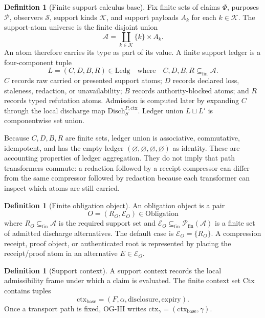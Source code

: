 \documentclass[11pt,twoside]{article}
\theoremstyle{definition}
\newtheorem{definition}[theorem]{Definition}
\newcommand{\Disch}{\mathrm{Disch}}
\newcommand{\Atoms}{\mathcal{A}}
\newcommand{\Ledg}{\mathrm{Ledg}}
\newcommand{\Obligation}{\mathrm{Obligation}}
\newcommand{\ctx}{\mathrm{ctx}}
\begin{document}
\begin{definition}[Finite support calculus base]
Fix finite sets of claims $\Phi$, purposes $\mathcal P$, observers
$\mathcal S$, support kinds $\mathcal K$, and support payloads
$A_k$ for each $k\in\mathcal K$. The support-atom universe is the
finite disjoint union
\[
  \Atoms=\coprod_{k\in\mathcal K}\{k\}\times A_k.
\]
An atom therefore carries its type as part of its value. A finite support ledger
is a four-component tuple
\[
  L=(C,D,B,R)\in\Ledg
  \quad\text{where}\quad
  C,D,B,R\subseteq_{\mathrm{fin}}\Atoms.
\]
$C$ records raw carried or presented support atoms; $D$ records declared loss,
staleness, redaction, or unavailability; $B$ records authority-blocked atoms;
and $R$ records typed refutation atoms. Admission is computed later by
expanding $C$ through the local discharge map $\Disch_S^{P,\ctx}$. Ledger union
$L\sqcup L'$ is componentwise set union.
\end{definition}

Because $C,D,B,R$ are finite sets, ledger union is associative, commutative,
idempotent, and has the empty ledger
$(\varnothing,\varnothing,\varnothing,\varnothing)$ as identity. These are
accounting properties of ledger aggregation. They do not imply that path
transformers commute: a redaction followed by a receipt compressor can differ
from the same compressor followed by redaction because each transformer can
inspect which atoms are still carried.

\begin{definition}[Finite obligation object]
An obligation object is a pair
\[
  O=(R_O,\mathcal E_O)\in\Obligation
\]
where $R_O\subseteq_{\mathrm{fin}}\Atoms$ is the required support set and
$\mathcal E_O\subseteq_{\mathrm{fin}}\mathcal P_{\mathrm{fin}}(\Atoms)$ is a
finite set of admitted discharge alternatives. The default case is
$\mathcal E_O=\{R_O\}$. A compression receipt, proof object, or authenticated
root is represented by placing the receipt/proof atom in an alternative
$E\in\mathcal E_O$.
\end{definition}

\begin{definition}[Support context]
A support context records the local admissibility frame under which a claim is
evaluated. The finite context set $\mathrm{Ctx}$ contains tuples
\[
  \ctx_{\mathrm{base}}=(F,\alpha,\mathrm{disclosure},\mathrm{expiry}).
\]
Once a transport path is fixed, OG-III writes $\ctx_\gamma=(\ctx_{\mathrm{base}},\gamma)$.
\end{definition}
\end{document}
